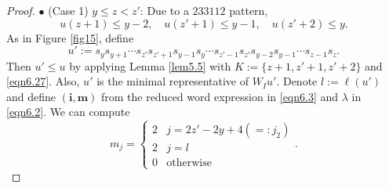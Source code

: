 \documentclass[12pt]{amsart}
\theoremstyle{definition}
\theoremstyle{remark}
\begin{document}
\begin{proof}
$\bullet$ (Case 1) $y \leq z< z'$: Due to a $233112$ pattern,
\begin{equation}\label{eqn6.27}
u(z+1) \leq y-2, \quad u(z'+1) \leq y-1, \quad u(z'+2) \leq y.
\end{equation}
As in Figure \ref{fig15}, define
\begin{equation}\label{eqn6.3}
u':=s_y s_{y+1} \cdots s_{z'} s_{z'+1} s_{y-1} s_y \cdots s_{z'-1}s_{z'} s_{y-2} s_{y-1} \cdots s_{z-1}s_z.
\end{equation}
Then $u' \leq u$ by applying Lemma \ref{lem5.5} with $K:=\{z+1, z'+1 , z'+2\}$ and \eqref{eqn6.27}. Also, $u'$ is the minimal representative of $W_Iu'$. Denote $l:= \ell (u')$ and define $(\mathbf{i}, \mathbf{m})$ from the reduced word expression in \eqref{eqn6.3} and $\lambda$ in \eqref{eqn6.2}. We can compute
\begin{equation}\label{eqn6.4}
m_j = 
\begin{cases}
2 & j = 2z'-2y+4 (=:j_2) \\
2 & j = l \\
0 & \text{otherwise}
\end{cases}
.
\end{equation}


\end{proof}
\end{document}
